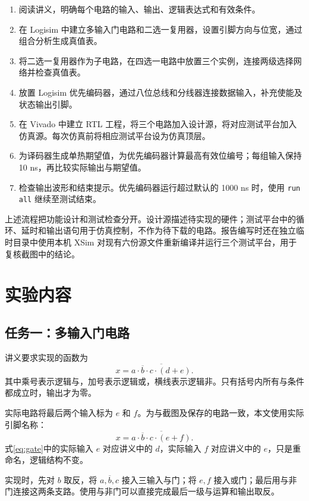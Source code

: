 \documentclass[12pt,a4paper,fontset=fandol]{ctexart}
\begin{document}
\begin{enumerate}
  \item 阅读讲义，明确每个电路的输入、输出、逻辑表达式和有效条件。
  \item 在 Logisim 中建立多输入门电路和二选一复用器，设置引脚方向与位宽，通过组合分析生成真值表。
  \item 将二选一复用器作为子电路，在四选一电路中放置三个实例，连接两级选择网络并检查真值表。
  \item 放置 Logisim 优先编码器，通过八位总线和分线器连接数据输入，补充使能及状态输出引脚。
  \item 在 Vivado 中建立 RTL 工程，将三个电路加入设计源，将对应测试平台加入仿真源。每次仿真前将相应测试平台设为仿真顶层。
  \item 为译码器生成单热期望值，为优先编码器计算最高有效位编号；每组输入保持 10 ns，再比较实际输出与期望值。
  \item 检查输出波形和结束提示。优先编码器运行超过默认的 1000 ns 时，使用 \texttt{run all} 继续至测试结束。
\end{enumerate}

上述流程把功能设计和测试检查分开。设计源描述待实现的硬件；测试平台中的循环、延时和输出语句用于仿真控制，不作为待下载的电路。报告编写时还在独立临时目录中使用本机 XSim 对现有六份源文件重新编译并运行三个测试平台，用于复核截图中的结论。

\section{实验内容}

\subsection{任务一：多输入门电路}

讲义要求实现的函数为
\begin{equation}
  x=\overline{a\cdot\overline b\cdot c\cdot(d+e)}.
\end{equation}
其中乘号表示逻辑与，加号表示逻辑或，横线表示逻辑非。只有括号内所有与条件都成立时，输出才为零。

实际电路将最后两个输入标为 $e$ 和 $f$。为与截图及保存的电路一致，本文使用实际引脚名称：
\begin{equation}
  x=\overline{a\cdot\overline b\cdot c\cdot(e+f)}.
  \label{eq:gate}
\end{equation}
式\eqref{eq:gate}中的实际输入 $e$ 对应讲义中的 $d$，实际输入 $f$ 对应讲义中的 $e$，只是重命名，逻辑结构不变。

实现时，先对 $b$ 取反，将 $a,\overline b,c$ 接入三输入与门；将 $e,f$ 接入或门；最后用与非门连接这两条支路。使用与非门可以直接完成最后一级与运算和输出取反。
\end{document}
